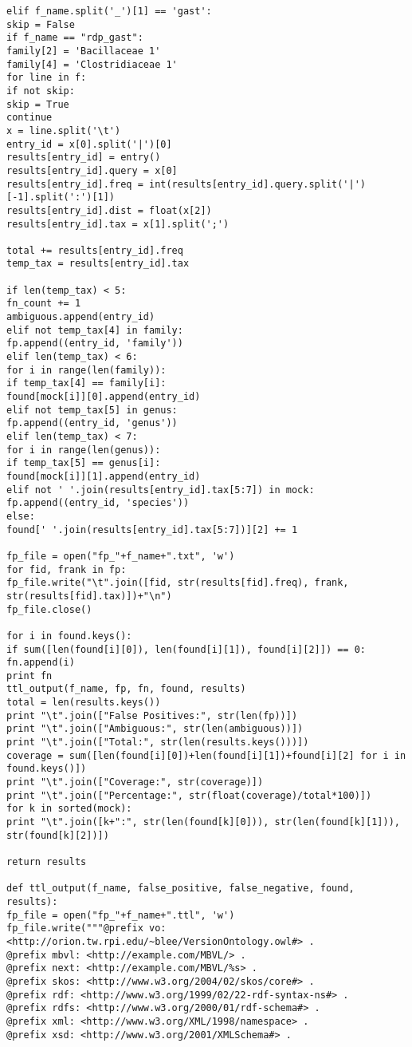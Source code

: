 \begin{verbatim}
elif f_name.split('_')[1] == 'gast':
skip = False
if f_name == "rdp_gast":
family[2] = 'Bacillaceae 1'
family[4] = 'Clostridiaceae 1'
for line in f:
if not skip:
skip = True
continue
x = line.split('\t')
entry_id = x[0].split('|')[0]
results[entry_id] = entry()
results[entry_id].query = x[0]
results[entry_id].freq = int(results[entry_id].query.split('|')[-1].split(':')[1])
results[entry_id].dist = float(x[2])
results[entry_id].tax = x[1].split(';')

total += results[entry_id].freq
temp_tax = results[entry_id].tax

if len(temp_tax) < 5:
fn_count += 1
ambiguous.append(entry_id)
elif not temp_tax[4] in family:
fp.append((entry_id, 'family'))
elif len(temp_tax) < 6:
for i in range(len(family)):
if temp_tax[4] == family[i]:
found[mock[i]][0].append(entry_id)
elif not temp_tax[5] in genus:
fp.append((entry_id, 'genus'))
elif len(temp_tax) < 7:
for i in range(len(genus)):
if temp_tax[5] == genus[i]:
found[mock[i]][1].append(entry_id)
elif not ' '.join(results[entry_id].tax[5:7]) in mock:
fp.append((entry_id, 'species'))
else:
found[' '.join(results[entry_id].tax[5:7])][2] += 1

fp_file = open("fp_"+f_name+".txt", 'w')
for fid, frank in fp:
fp_file.write("\t".join([fid, str(results[fid].freq), frank, str(results[fid].tax)])+"\n")
fp_file.close()

for i in found.keys():
if sum([len(found[i][0]), len(found[i][1]), found[i][2]]) == 0:
fn.append(i)
print fn
ttl_output(f_name, fp, fn, found, results)
total = len(results.keys())
print "\t".join(["False Positives:", str(len(fp))])
print "\t".join(["Ambiguous:", str(len(ambiguous))])
print "\t".join(["Total:", str(len(results.keys()))])
coverage = sum([len(found[i][0])+len(found[i][1])+found[i][2] for i in found.keys()])
print "\t".join(["Coverage:", str(coverage)])
print "\t".join(["Percentage:", str(float(coverage)/total*100)])
for k in sorted(mock):
print "\t".join([k+":", str(len(found[k][0])), str(len(found[k][1])), str(found[k][2])])

return results

def ttl_output(f_name, false_positive, false_negative, found, results):
fp_file = open("fp_"+f_name+".ttl", 'w')
fp_file.write("""@prefix vo: <http://orion.tw.rpi.edu/~blee/VersionOntology.owl#> .
@prefix mbvl: <http://example.com/MBVL/> .
@prefix next: <http://example.com/MBVL/%s> .
@prefix skos: <http://www.w3.org/2004/02/skos/core#> .
@prefix rdf: <http://www.w3.org/1999/02/22-rdf-syntax-ns#> .
@prefix rdfs: <http://www.w3.org/2000/01/rdf-schema#> .
@prefix xml: <http://www.w3.org/XML/1998/namespace> .
@prefix xsd: <http://www.w3.org/2001/XMLSchema#> .


\end{verbatim}
